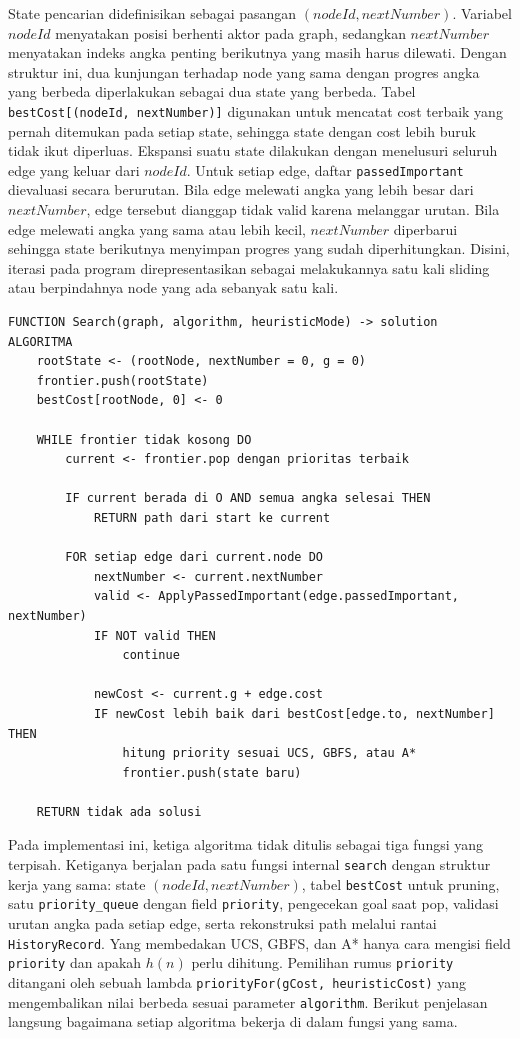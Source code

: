 \documentclass[a4paper,11pt]{article}
\begin{document}
State pencarian didefinisikan sebagai pasangan $(nodeId, nextNumber)$. Variabel $nodeId$ menyatakan posisi berhenti aktor pada graph, sedangkan $nextNumber$ menyatakan indeks angka penting berikutnya yang masih harus dilewati. Dengan struktur ini, dua kunjungan terhadap node yang sama dengan progres angka yang berbeda diperlakukan sebagai dua state yang berbeda. Tabel \texttt{bestCost[(nodeId, nextNumber)]} digunakan untuk mencatat cost terbaik yang pernah ditemukan pada setiap state, sehingga state dengan cost lebih buruk tidak ikut diperluas. Ekspansi suatu state dilakukan dengan menelusuri seluruh edge yang keluar dari $nodeId$. Untuk setiap edge, daftar \texttt{passedImportant} dievaluasi secara berurutan. Bila edge melewati angka yang lebih besar dari $nextNumber$, edge tersebut dianggap tidak valid karena melanggar urutan. Bila edge melewati angka yang sama atau lebih kecil, $nextNumber$ diperbarui sehingga state berikutnya menyimpan progres yang sudah diperhitungkan. Disini, iterasi pada program direpresentasikan sebagai melakukannya satu kali sliding atau berpindahnya node yang ada sebanyak satu kali.

\begin{lstlisting}[language=Pseudocode, caption=Pseudocode Pathfinding, label={lst:pathfinding}]
FUNCTION Search(graph, algorithm, heuristicMode) -> solution
ALGORITMA
    rootState <- (rootNode, nextNumber = 0, g = 0)
    frontier.push(rootState)
    bestCost[rootNode, 0] <- 0

    WHILE frontier tidak kosong DO
        current <- frontier.pop dengan prioritas terbaik

        IF current berada di O AND semua angka selesai THEN
            RETURN path dari start ke current

        FOR setiap edge dari current.node DO
            nextNumber <- current.nextNumber
            valid <- ApplyPassedImportant(edge.passedImportant, nextNumber)
            IF NOT valid THEN
                continue

            newCost <- current.g + edge.cost
            IF newCost lebih baik dari bestCost[edge.to, nextNumber] THEN
                hitung priority sesuai UCS, GBFS, atau A*
                frontier.push(state baru)

    RETURN tidak ada solusi
\end{lstlisting}

Pada implementasi ini, ketiga algoritma tidak ditulis sebagai tiga fungsi yang terpisah. Ketiganya berjalan pada satu fungsi internal \texttt{search} dengan struktur kerja yang sama: state $(nodeId, nextNumber)$, tabel \texttt{bestCost} untuk pruning, satu \texttt{priority\_queue} dengan field \texttt{priority}, pengecekan goal saat pop, validasi urutan angka pada setiap edge, serta rekonstruksi path melalui rantai \texttt{HistoryRecord}. Yang membedakan UCS, GBFS, dan A* hanya cara mengisi field \texttt{priority} dan apakah $h(n)$ perlu dihitung. Pemilihan rumus \texttt{priority} ditangani oleh sebuah lambda \texttt{priorityFor(gCost, heuristicCost)} yang mengembalikan nilai berbeda sesuai parameter \texttt{algorithm}. Berikut penjelasan langsung bagaimana setiap algoritma bekerja di dalam fungsi yang sama.
\end{document}
